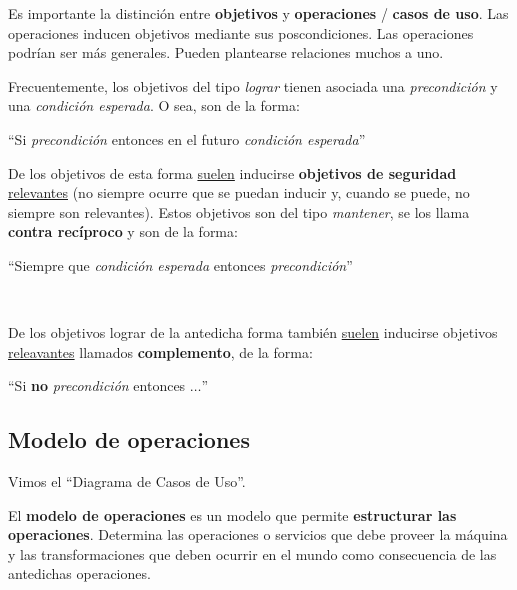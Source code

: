 \documentclass[]{article}
\begin{document}
Es importante la distinción entre \textbf{objetivos} y \textbf{operaciones} / \textbf{casos de uso}. Las operaciones inducen objetivos mediante sus poscondiciones. Las operaciones podrían ser más generales. Pueden plantearse relaciones muchos a uno.


Frecuentemente, los objetivos del tipo \textit{lograr} tienen asociada una \textit{precondición} y una \textit{condición esperada}. O sea, son de la forma:
\begin{center}
	``Si \textit{precondición} entonces en el futuro \textit{condición esperada}''
\end{center}

De los objetivos de esta forma \underline{suelen} inducirse \textbf{objetivos de seguridad} \underline{relevantes} (no siempre ocurre que se puedan inducir y, cuando se puede, no siempre son relevantes). Estos objetivos son del tipo \textit{mantener}, se los llama \textbf{contra recíproco} y son de la forma:
\begin{center}
	``Siempre que \textit{condición esperada} entonces \textit{precondición}''
\end{center}~\newline

De los objetivos lograr de la antedicha forma también \underline{suelen} inducirse objetivos \underline{releavantes} llamados \textbf{complemento}, de la forma:
\begin{center}
	``Si \textbf{no} \textit{precondición} entonces $\hdots$''
\end{center}

\subsection{Modelo de operaciones}
Vimos el ``Diagrama de Casos de Uso''.

El \textbf{modelo de operaciones} es un modelo que permite \textbf{estructurar las operaciones}. Determina las operaciones o servicios que debe proveer la máquina y las transformaciones que deben ocurrir en el mundo como consecuencia de las antedichas operaciones.
\end{document}
